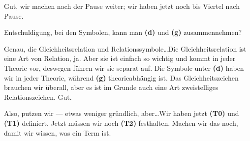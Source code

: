 \begin{spoken-clean}[00:45:05 - 00:46:40]
Gut, wir machen nach der Pause weiter; wir haben jetzt noch bis Viertel nach Pause. 
\end{spoken-clean}

\begin{ai-global-state-checkpoint-invisible-content}
\end{ai-global-state-checkpoint-invisible-content}

\begin{spoken-clean}[00:46:40 - 00:47:30]
\end{spoken-clean}

\begin{student-interaction}[Studentenfrage]
Entschuldigung, bei den Symbolen, kann man \textbf{(d)} und \textbf{(g)} zusammennehmen?
\end{student-interaction}

\begin{spoken-clean}[continued]
Genau, die Gleichheitsrelation und Relationssymbole\dots Die Gleichheitsrelation ist eine Art von Relation, ja. Aber sie ist einfach so wichtig und kommt in jeder Theorie vor, deswegen führen wir sie separat auf. Die Symbole unter \textbf{(d)} haben wir in jeder Theorie, während \textbf{(g)} theorieabhängig ist. Das Gleichheitszeichen brauchen wir überall, aber es ist im Grunde auch eine Art zweistelliges Relationszeichen. Gut.
\end{spoken-clean}

\begin{spoken-clean}[00:47:30 - 00:49:25]
 Also, putzen wir --- etwas weniger gründlich, aber\dots Wir haben jetzt \textbf{(T0)} und \textbf{(T1)} definiert. Jetzt müssen wir noch \textbf{(T2)} festhalten. Machen wir das noch, damit wir wissen, was ein Term ist.
\end{spoken-clean}

